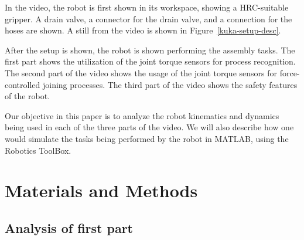 \documentclass[conference]{IEEEtran}
\begin{document}
In the video, the robot is first shown in its workspace, showing a HRC-suitable
gripper. A drain valve, a connector for the drain valve, and a connection for
the hoses are shown. A still from the video is shown in Figure~\ref{kuka-setup-desc}.

After the setup is shown, the robot is shown performing the assembly tasks. The first
part shows the utilization of the joint torque sensors for process recognition. The second
part of the video shows the usage of the joint torque sensors for force-controlled
joining processes. The third part of the video shows the safety features of the robot.

Our objective in this paper is to analyze the robot kinematics and dynamics being
used in each of the three parts of the video. We will also describe how one would
simulate the tasks being performed by the robot in MATLAB, using the Robotics
ToolBox.

\section{Materials and Methods}

\subsection{Analysis of first part}





\end{document}
